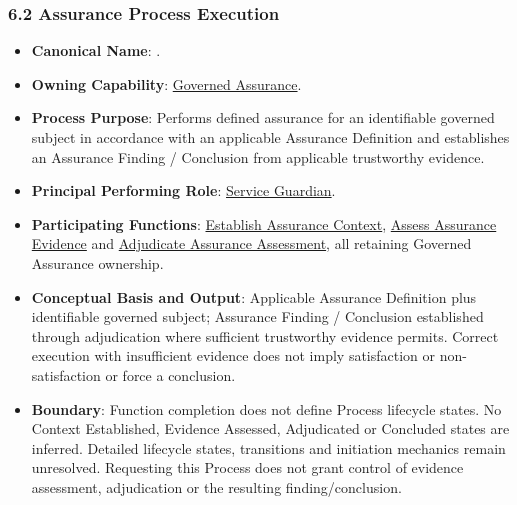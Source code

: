 \label{rad:processes:367}
\subsubsection*{6.2 Assurance Process Execution}
\label{rad:processes:369}

\begin{itemize}

\item 
\textbf{Canonical Name}: \texttt{}.



\item 
\textbf{Owning Capability}: \hyperref[rad:enabling:694]{Governed Assurance}.



\item 
\textbf{Process Purpose}: Performs defined assurance for an identifiable governed subject in accordance with an applicable Assurance Definition and establishes an Assurance Finding /\allowbreak{} Conclusion from applicable trustworthy evidence.



\item 
\textbf{Principal Performing Role}: \href{https://github.com/fhirfactory/harmonia/blob/98410db60155198a75f74c79d98060070209faa1/docs/markdown/03-business-architecture/actors-roles/roles.md\#service-guardian}{Service Guardian}.



\item 
\textbf{Participating Functions}: \hyperref[rad:assurance:98]{Establish Assurance Context}, \hyperref[rad:assurance:108]{Assess Assurance Evidence} and \hyperref[rad:assurance:116]{Adjudicate Assurance Assessment}, all retaining Governed Assurance ownership.



\item 
\textbf{Conceptual Basis and Output}: Applicable Assurance Definition plus identifiable governed subject; Assurance Finding /\allowbreak{} Conclusion established through adjudication where sufficient trustworthy evidence permits. Correct execution with insufficient evidence does not imply satisfaction or non-satisfaction or force a conclusion.



\item 
\textbf{Boundary}: Function completion does not define Process lifecycle states. No Context Established, Evidence Assessed, Adjudicated or Concluded states are inferred. Detailed lifecycle states, transitions and initiation mechanics remain unresolved. Requesting this Process does not grant control of evidence assessment, adjudication or the resulting finding/\allowbreak{}conclusion.



\end{itemize}
\label{rad:processes:377}

